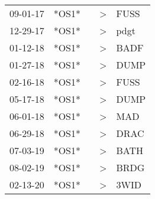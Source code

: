 \begin{supertabular}{lllll}
 09-01-17 &  *OS1* &   &  \textgreater &  FUSS \\
 12-29-17 &  *OS1* &   &  \textgreater &  pdgt \\
 01-12-18 &  *OS1* &   &  \textgreater &  BADF \\
 01-27-18 &  *OS1* &   &  \textgreater &  DUMP \\
 02-16-18 &  *OS1* &   &  \textgreater &  FUSS \\
 05-17-18 &  *OS1* &   &  \textgreater &  DUMP \\
 06-01-18 &  *OS1* &   &  \textgreater &   MAD \\
 06-29-18 &  *OS1* &   &  \textgreater &  DRAC \\
 07-03-19 &  *OS1* &   &  \textgreater &  BATH \\
 08-02-19 &  *OS1* &   &  \textgreater &  BRDG \\
 02-13-20 &  *OS1* &   &  \textgreater &  3WID \\
\end{supertabular}
